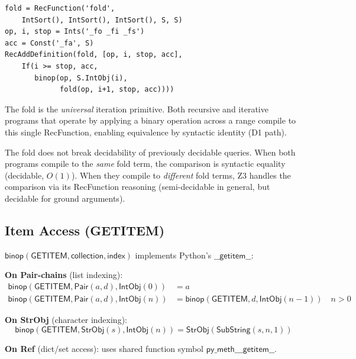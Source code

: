 \begin{lstlisting}[caption={fold: complete Z3 implementation}]
fold = RecFunction('fold',
    IntSort(), IntSort(), IntSort(), S, S)
op, i, stop = Ints('_fo _fi _fs')
acc = Const('_fa', S)
RecAddDefinition(fold, [op, i, stop, acc],
    If(i >= stop, acc,
       binop(op, S.IntObj(i),
             fold(op, i+1, stop, acc))))
\end{lstlisting}

The fold is the \emph{universal} iteration primitive.  Both recursive
and iterative programs that operate by applying a binary operation
across a range compile to this single RecFunction, enabling
equivalence by syntactic identity (D1 path).

\begin{proposition}
\label{prop:fold-decidable}
The fold does not break decidability of previously decidable queries.
When both programs compile to the \emph{same} fold term, the
comparison is syntactic equality (decidable, $O(1)$).  When they
compile to \emph{different} fold terms, Z3 handles the comparison
via its RecFunction reasoning (semi-decidable in general, but
decidable for ground arguments).
\end{proposition}

\subsection{Item Access (GETITEM)}

\begin{definition}
$\mathsf{binop}(\mathsf{GETITEM}, \mathsf{collection}, \mathsf{index})$
implements Python's $\mathsf{\_\_getitem\_\_}$:

\textbf{On Pair-chains} (list indexing):
\begin{align}
  \mathsf{binop}(\mathsf{GETITEM}, \mathsf{Pair}(a, d),
    \mathsf{IntObj}(0)) &= a \\
  \mathsf{binop}(\mathsf{GETITEM}, \mathsf{Pair}(a, d),
    \mathsf{IntObj}(n)) &= \mathsf{binop}(\mathsf{GETITEM}, d,
    \mathsf{IntObj}(n-1)) \quad n > 0
\end{align}

\textbf{On StrObj} (character indexing):
\[
  \mathsf{binop}(\mathsf{GETITEM}, \mathsf{StrObj}(s),
    \mathsf{IntObj}(n)) = \mathsf{StrObj}(\mathsf{SubString}(s, n, 1))
\]

\textbf{On Ref} (dict/set access): uses shared function symbol
$\mathsf{py\_meth\_\_\_getitem\_\_}$.
\end{definition}


